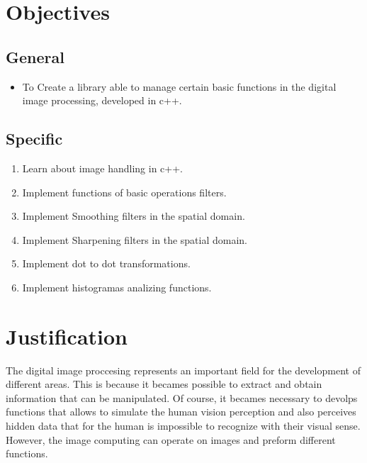 \documentclass[a4paper]{article}
\begin{document}
\section{Objectives}
	\subsection{General}

		\begin{itemize}

		\item To Create a library able to manage certain basic functions in the digital image processing, developed in c++.

		\end{itemize}

	\subsection{Specific}

		\begin{enumerate}
     
        	\item{Learn about image handling in c++.}

			\item{Implement functions of basic operations filters.}

			\item{Implement Smoothing filters in the spatial domain.}
            
            \item{Implement Sharpening filters in the spatial domain.}
            
            \item{Implement dot to dot transformations.}
            
            \item{Implement histogramas analizing functions.}

		\end{enumerate}
\section{Justification}

The digital image proccesing represents an important field for the development of different areas. This is because it becames possible to extract and obtain information that can be manipulated. Of course, it becames necessary to devolps functions that allows to simulate the human vision perception and also perceives hidden data that for the human is impossible to recognize with their visual sense. However, the image computing can operate on images and preform different functions.
\end{document}
